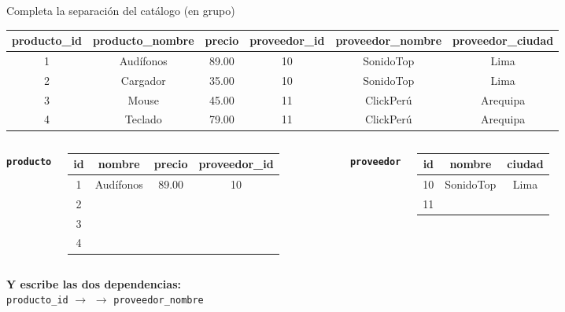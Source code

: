 \documentclass[aspectratio=169,10pt,c]{beamer}
\newcommand{\fdep}{$\rightarrow$}
\newcommand{\bl}[1][1.9cm]{\underline{\hspace{#1}}}
\begin{document}
\begin{frame}{Completa la separación del catálogo \textnormal{\small(en grupo)}}
\begin{center}
\footnotesize\setlength\tabcolsep{5pt}
\begin{tabular}{cccccc}
\toprule
\bfseries producto\_id & \bfseries producto\_nombre & \bfseries precio & \bfseries proveedor\_id & \bfseries proveedor\_nombre & \bfseries proveedor\_ciudad \\
\midrule
1 & Audífonos & 89.00 & 10 & SonidoTop & Lima \\
2 & Cargador  & 35.00 & 10 & SonidoTop & Lima \\
3 & Mouse     & 45.00 & 11 & ClickPerú & Arequipa \\
4 & Teclado   & 79.00 & 11 & ClickPerú & Arequipa \\
\bottomrule
\end{tabular}
\end{center}
\vspace{0.35cm}
\begin{columns}[T,onlytextwidth]
\centering\footnotesize \texttt{\textbf{producto}}\\[3pt]
\begin{tabular}{cccc}
\toprule
\bfseries id & \bfseries nombre & \bfseries precio & \bfseries proveedor\_id \\
\midrule
1 & Audífonos & 89.00 & 10 \\
2 & \bl[1.1cm] & \bl[.8cm] & \bl[.7cm] \\
3 & \bl[1.1cm] & \bl[.8cm] & \bl[.7cm] \\
4 & \bl[1.1cm] & \bl[.8cm] & \bl[.7cm] \\
\bottomrule
\end{tabular}
\centering\footnotesize \texttt{\textbf{proveedor}}\\[3pt]
\begin{tabular}{ccc}
\toprule
\bfseries id & \bfseries nombre & \bfseries ciudad \\
\midrule
10 & SonidoTop & Lima \\
11 & \bl[1.5cm] & \bl[1.5cm] \\
\bottomrule
\end{tabular}
\end{columns}
\vspace{0.4cm}
\small \textbf{Y escribe las dos dependencias:}\\[5pt]
\hspace*{1cm}\texttt{producto\_id} \fdep{} \bl[2.8cm] \hspace{1.4cm} \bl[2.8cm] \fdep{} \texttt{proveedor\_nombre}
\end{frame}
\end{document}
